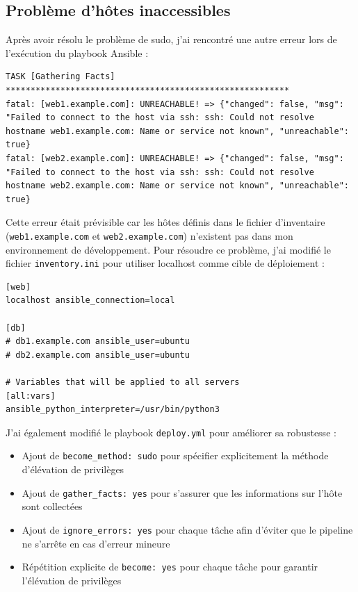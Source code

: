 \documentclass{article}
\begin{document}
\subsection{Problème d'hôtes inaccessibles}

Après avoir résolu le problème de sudo, j'ai rencontré une autre erreur lors de l'exécution du playbook Ansible :

\begin{lstlisting}
TASK [Gathering Facts] *********************************************************
fatal: [web1.example.com]: UNREACHABLE! => {"changed": false, "msg": "Failed to connect to the host via ssh: ssh: Could not resolve hostname web1.example.com: Name or service not known", "unreachable": true}
fatal: [web2.example.com]: UNREACHABLE! => {"changed": false, "msg": "Failed to connect to the host via ssh: ssh: Could not resolve hostname web2.example.com: Name or service not known", "unreachable": true}
\end{lstlisting}

Cette erreur était prévisible car les hôtes définis dans le fichier d'inventaire (\texttt{web1.example.com} et \texttt{web2.example.com}) n'existent pas dans mon environnement de développement. Pour résoudre ce problème, j'ai modifié le fichier \texttt{inventory.ini} pour utiliser localhost comme cible de déploiement :

\begin{lstlisting}
[web]
localhost ansible_connection=local

[db]
# db1.example.com ansible_user=ubuntu
# db2.example.com ansible_user=ubuntu

# Variables that will be applied to all servers
[all:vars]
ansible_python_interpreter=/usr/bin/python3
\end{lstlisting}

J'ai également modifié le playbook \texttt{deploy.yml} pour améliorer sa robustesse :
\begin{itemize}
    \item Ajout de \texttt{become\_method: sudo} pour spécifier explicitement la méthode d'élévation de privilèges
    \item Ajout de \texttt{gather\_facts: yes} pour s'assurer que les informations sur l'hôte sont collectées
    \item Ajout de \texttt{ignore\_errors: yes} pour chaque tâche afin d'éviter que le pipeline ne s'arrête en cas d'erreur mineure
    \item Répétition explicite de \texttt{become: yes} pour chaque tâche pour garantir l'élévation de privilèges
\end{itemize}
\end{document}
